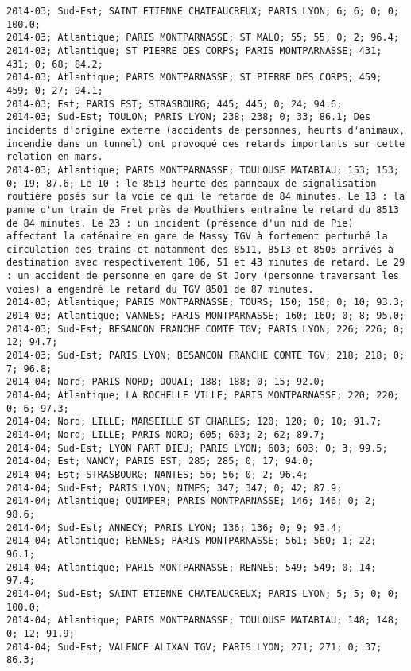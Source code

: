 \documentclass{article}
\begin{document}
\begin{Verbatim}[commandchars=\\\{\}]
2014-03; Sud-Est; SAINT ETIENNE CHATEAUCREUX; PARIS LYON; 6; 6; 0; 0; 100.0; 
2014-03; Atlantique; PARIS MONTPARNASSE; ST MALO; 55; 55; 0; 2; 96.4; 
2014-03; Atlantique; ST PIERRE DES CORPS; PARIS MONTPARNASSE; 431; 431; 0; 68; 84.2; 
2014-03; Atlantique; PARIS MONTPARNASSE; ST PIERRE DES CORPS; 459; 459; 0; 27; 94.1; 
2014-03; Est; PARIS EST; STRASBOURG; 445; 445; 0; 24; 94.6; 
2014-03; Sud-Est; TOULON; PARIS LYON; 238; 238; 0; 33; 86.1; Des incidents d'origine externe (accidents de personnes, heurts d'animaux, incendie dans un tunnel) ont provoqué des retards importants sur cette relation en mars.
2014-03; Atlantique; PARIS MONTPARNASSE; TOULOUSE MATABIAU; 153; 153; 0; 19; 87.6; Le 10 : le 8513 heurte des panneaux de signalisation routière posés sur la voie ce qui le retarde de 84 minutes. Le 13 : la panne d'un train de Fret près de Mouthiers entraîne le retard du 8513 de 84 minutes. Le 23 : un incident (présence d'un nid de Pie) affectant la caténaire en gare de Massy TGV à fortement perturbé la circulation des trains et notamment des 8511, 8513 et 8505 arrivés à destination avec respectivement 106, 51 et 43 minutes de retard. Le 29 : un accident de personne en gare de St Jory (personne traversant les voies) a engendré le retard du TGV 8501 de 87 minutes.
2014-03; Atlantique; PARIS MONTPARNASSE; TOURS; 150; 150; 0; 10; 93.3; 
2014-03; Atlantique; VANNES; PARIS MONTPARNASSE; 160; 160; 0; 8; 95.0; 
2014-03; Sud-Est; BESANCON FRANCHE COMTE TGV; PARIS LYON; 226; 226; 0; 12; 94.7; 
2014-03; Sud-Est; PARIS LYON; BESANCON FRANCHE COMTE TGV; 218; 218; 0; 7; 96.8; 
2014-04; Nord; PARIS NORD; DOUAI; 188; 188; 0; 15; 92.0; 
2014-04; Atlantique; LA ROCHELLE VILLE; PARIS MONTPARNASSE; 220; 220; 0; 6; 97.3; 
2014-04; Nord; LILLE; MARSEILLE ST CHARLES; 120; 120; 0; 10; 91.7; 
2014-04; Nord; LILLE; PARIS NORD; 605; 603; 2; 62; 89.7; 
2014-04; Sud-Est; LYON PART DIEU; PARIS LYON; 603; 603; 0; 3; 99.5; 
2014-04; Est; NANCY; PARIS EST; 285; 285; 0; 17; 94.0; 
2014-04; Est; STRASBOURG; NANTES; 56; 56; 0; 2; 96.4; 
2014-04; Sud-Est; PARIS LYON; NIMES; 347; 347; 0; 42; 87.9; 
2014-04; Atlantique; QUIMPER; PARIS MONTPARNASSE; 146; 146; 0; 2; 98.6; 
2014-04; Sud-Est; ANNECY; PARIS LYON; 136; 136; 0; 9; 93.4; 
2014-04; Atlantique; RENNES; PARIS MONTPARNASSE; 561; 560; 1; 22; 96.1; 
2014-04; Atlantique; PARIS MONTPARNASSE; RENNES; 549; 549; 0; 14; 97.4; 
2014-04; Sud-Est; SAINT ETIENNE CHATEAUCREUX; PARIS LYON; 5; 5; 0; 0; 100.0; 
2014-04; Atlantique; PARIS MONTPARNASSE; TOULOUSE MATABIAU; 148; 148; 0; 12; 91.9; 
2014-04; Sud-Est; VALENCE ALIXAN TGV; PARIS LYON; 271; 271; 0; 37; 86.3; 

\end{Verbatim}
\end{document}
